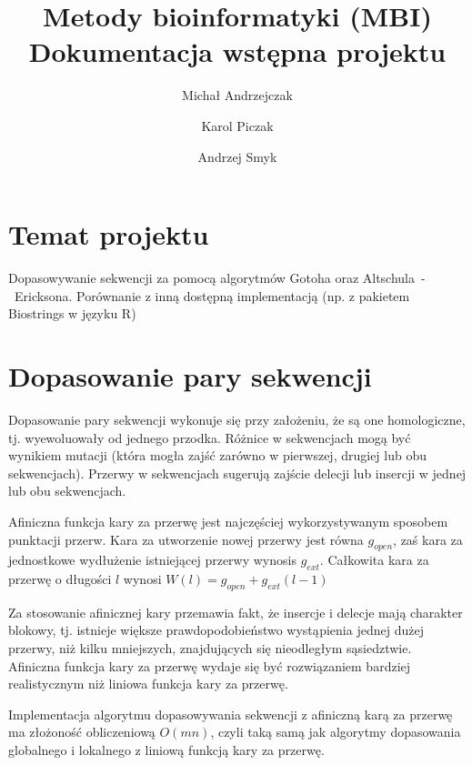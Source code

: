 \documentclass[a4paper,10pt]{article}
\title{Metody bioinformatyki (MBI)\\Dokumentacja wstępna projektu}
\author{Michał Andrzejczak
		\and
		Karol Piczak
		\and
		Andrzej Smyk
		}
\begin{document}
	\maketitle
	\section{Temat projektu}

	\indent Dopasowywanie sekwencji za pomocą algorytmów Gotoha oraz \linebreak\mbox{Altschula - Ericksona}. Porównanie z inną dostępną implementacją (np. z pakietem Biostrings w języku R)

	\section{Dopasowanie pary sekwencji}

	Dopasowanie pary sekwencji wykonuje się przy założeniu, że są one homologiczne, tj. wyewoluowały od jednego przodka. Różnice w sekwencjach mogą być wynikiem mutacji (która mogła zajść zarówno w pierwszej, drugiej lub obu sekwencjach). Przerwy w sekwencjach sugerują zajście delecji lub insercji w jednej lub obu sekwencjach.

	Afiniczna funkcja kary za przerwę jest najczęściej wykorzystywanym sposobem punktacji przerw. Kara za utworzenie nowej przerwy jest równa $g_{open}$, zaś kara za jednostkowe wydłużenie istniejącej przerwy wynosis $g_{ext}$. Całkowita kara za przerwę o długości $l$ wynosi \mbox{$W(l) = g_{open} + g_{ext}(l - 1)$}

	Za stosowanie afinicznej kary przemawia fakt, że insercje i delecje mają charakter blokowy, tj. istnieje większe prawdopodobieństwo wystąpienia jednej dużej przerwy, niż kilku mniejszych, znajdujących się nieodległym sąsiedztwie. Afiniczna funkcja kary za przerwę wydaje się być rozwiązaniem bardziej realistycznym niż liniowa funkcja kary za przerwę.

	Implementacja algorytmu dopasowywania sekwencji z afiniczną karą za przerwę ma złożoność obliczeniową $O(mn)$, czyli taką samą jak algorytmy dopasowania globalnego i lokalnego z liniową funkcją kary za przerwę.
\end{document}
